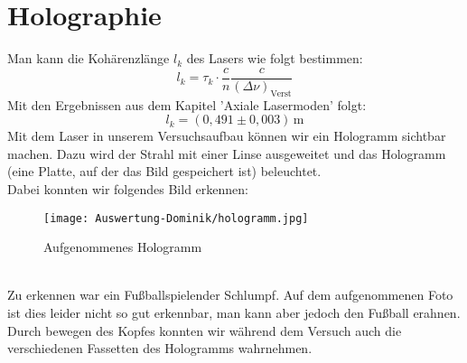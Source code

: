 \section{Holographie}
Man kann die Kohärenzlänge $l_k$ des Lasers wie folgt bestimmen:
\begin{equation}
    l_k=\tau_k\cdot\frac{c}{n}\frac{c}{\left(\Delta\nu\right)_\text{Verst}}
\end{equation}
Mit den Ergebnissen aus dem Kapitel 'Axiale Lasermoden' folgt:
\begin{equation}
    l_k=\left(0,491\pm0,003\right)\,\text{m}
\end{equation}
Mit dem Laser in unserem Versuchsaufbau können wir ein Hologramm sichtbar machen.
Dazu wird der Strahl mit einer Linse ausgeweitet und das Hologramm (eine Platte, auf der das Bild gespeichert ist) beleuchtet.\\
Dabei konnten wir folgendes Bild erkennen:
\begin{figure}[h]
    \centering\texttt{[image: Auswertung-Dominik/hologramm.jpg]}
    \caption{Aufgenommenes Hologramm}
\end{figure}\\
Zu erkennen war ein Fußballspielender Schlumpf.
Auf dem aufgenommenen Foto ist dies leider nicht so gut erkennbar, man kann aber jedoch den Fußball erahnen. Durch bewegen des Kopfes konnten wir während dem Versuch auch die verschiedenen Fassetten des Hologramms wahrnehmen.
